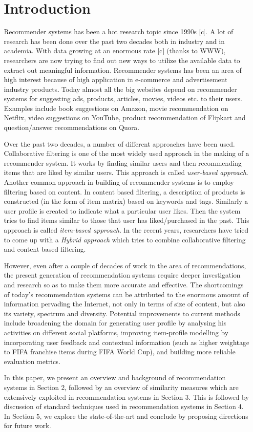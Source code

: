 \section{Introduction}
Recommender systems has been a hot research topic since 1990s [c]. A lot of research has been done over the past two decades both in industry and in academia. With data growing at an enormous rate [c] (thanks to WWW), researchers are now trying to find out new ways to utilize the available data to extract out meaningful information.  Recommender systems has been an area of high interest because of high application in e-commerce and advertisement industry products. Today almost all the big websites depend on recommender systems for suggesting ads, products, articles, movies, videos etc. to their users. Examples include book suggestions on Amazon, movie recommendation on Netflix, video suggestions on YouTube, product recommendation of Flipkart and question/answer recommendations on Quora. 

Over the past two decades, a number of different approaches have been used. Collaborative filtering is one of the most widely used approach in the making of a recommender system. It works by finding similar users and then recommending items that are liked by similar users. This approach is called \textit{user-based approach}. Another common approach in building of recommender systems is to employ filtering based on content. In content based filtering, a description of products is constructed (in the form of item matrix) based on keywords and tags. Similarly a user profile is created to indicate what a particular user likes. Then the system tries to find items similar to those that user has liked/purchased in the past. This approach is called \textit{item-based approach}. In the recent years, researchers have tried to come up with a \textit{Hybrid approach} which tries to combine collaborative filtering and content based filtering. 

However, even after a couple of decades of work in the area of recommendations, the present generation of recommendation systems require deeper investigation and research so as to make them more accurate and effective. The shortcomings of today's recommendation systems can be attributed to the enormous amount of information pervading the Internet, not only in terms of size of content, but also its variety, spectrum and diversity. Potential improvements to current methods include broadening the domain for generating user profile by analysing his activities on different social platforms, improving item-profile modelling by incorporating user feedback and contextual information (such as higher weightage to FIFA franchise items during FIFA World Cup), and building more reliable evaluation metrics. 

In this paper, we present an overview and background of recommendation systems in Section 2, followed by an overview of similarity measures which are extensively exploited in recommendation systems in Section 3. This is followed by discussion of standard techniques used in recommendation systems in Section 4. In Section 5, we explore the state-of-the-art and conclude by proposing directions for future work. 